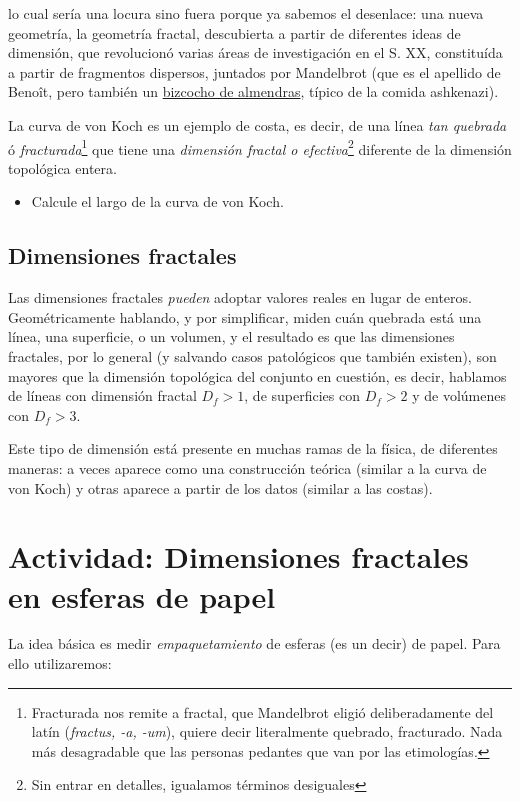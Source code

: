 \documentclass[10pt,a4paper]{article}
\numberwithin{equation}{section}
\begin{document}
\noindent lo cual sería una locura sino fuera porque ya sabemos el desenlace: una nueva geometría, la geometría fractal, descubierta a partir de diferentes ideas de dimensión, que revolucionó varias áreas de investigación en el S. XX, constituída a partir de fragmentos dispersos, juntados por Mandelbrot (que es el apellido de Benoît, pero también un \href{https://www.thespruceeats.com/jewish-mandelbrot-recipe-1136149}{bizcocho de almendras}, típico de la comida ashkenazi).

La curva de von Koch es un ejemplo de costa, es decir, de una línea \textit{tan quebrada} ó \textit{fracturada}\footnote{Fracturada nos remite a fractal, que Mandelbrot eligió deliberadamente del latín (\textit{fractus, -a, -um}), quiere decir literalmente quebrado, fracturado. Nada más desagradable que las personas pedantes que van por las etimologías.} que tiene una \textit{dimensión fractal o efectiva}\footnote{Sin entrar en detalles, igualamos términos desiguales} diferente de la dimensión topológica entera.

\begin{itemize}
\item[$\bullet$] Calcule el largo de la curva de von Koch.
\end{itemize} 


\subsection{Dimensiones fractales}

Las dimensiones fractales \textit{pueden} adoptar valores reales en lugar de enteros. Geométricamente hablando, y por simplificar, miden cuán quebrada está una línea, una superficie, o un volumen, y el resultado es que las dimensiones fractales, por lo general (y salvando casos patológicos que también existen), son mayores que la dimensión topológica del conjunto en cuestión, es decir, hablamos de líneas con dimensión fractal $D_f > 1$, de superficies con $D_f > 2$ y de volúmenes con $D_f > 3$. 

Este tipo de dimensión está presente en muchas ramas de la física, de diferentes maneras: a veces aparece como una construcción teórica (similar a la curva de von Koch) y otras aparece a partir de los datos (similar a las costas). 

\pagebreak
  \section{Actividad: Dimensiones fractales en esferas de papel}
La idea básica es medir \textit{empaquetamiento} de esferas (es un decir) de papel. Para ello utilizaremos:
\end{document}

